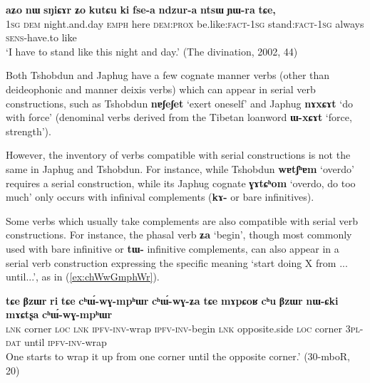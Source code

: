 \documentclass[oneside,a4paper,11pt]{article}
\newcommand{\ipa}[1]{\textbf{\phon#1}} %
\newcommand{\jpg}[2]{\ipa{#1} `#2'} %
\begin{document}
\begin{exe}
\ex \label{ex:ki.fsea}
\gll \ipa{aʑo} 	\ipa{nɯ} 	\ipa{sŋiɕɤr} 	\ipa{ʑo} 	\ipa{kutɕu} 	\ipa{ki} 	\ipa{fse-a} 	\ipa{ndzur-a} 	\ipa{ntsɯ} 	\ipa{ɲɯ-ra} 	\ipa{tɕe,} \\
\textsc{1sg} \textsc{dem} night.and.day \textsc{emph} here \textsc{dem:prox} be.like:\textsc{fact-1sg} stand:\textsc{fact-1sg} always \textsc{sens}-have.to like \\
\glt `I have to stand like this night and day.' (The divination, 2002, 44)
\end{exe}




Both Tshobdun and Japhug have a few cognate manner verbs (other than deideophonic and manner deixis verbs) which can appear in serial verb constructions, such as Tshobdun \jpg{nɐʃeʃet}{exert oneself} and Japhug  \jpg{nɤxɕɤt}{do with force}  (denominal verbs derived from the Tibetan loanword \jpg{ɯ-xɕɤt}{force, strength}).

However, the inventory of verbs compatible with serial constructions is not the same in Japhug and Tshobdun. For instance, while Tshobdun \jpg{wɐtʃʰɐm}{overdo} requires a serial construction, while its Japhug cognate \jpg{ɣɤtɕʰom}{overdo, do too much}  only occurs with infinival complements (\ipa{kɤ-} or bare infinitives).

Some verbs which usually take complements are also compatible with serial verb constructions. 
 For instance, the phasal verb \jpg{ʑa}{begin}, though most commonly used with bare infinitive or \ipa{tɯ-} infinitive complements, can also appear in a serial verb construction expressing the specific meaning `start doing X from ... until...', as in (\ref{ex:chWwGmphWr}).

   \begin{exe}
\ex \label{ex:chWwGmphWr}
 \gll  \ipa{tɕe} 	\ipa{βzɯr} 	\ipa{ri} 	\ipa{tɕe} 	\ipa{cʰɯ́-wɣ-mpʰɯr} 	\ipa{cʰɯ́-wɣ-ʑa} 	\ipa{tɕe} 	\ipa{mɤpɕoʁ} 	\ipa{cʰu} 	\ipa{βzɯr} 	\ipa{nɯ-ɕki} 	\ipa{mɤɕtʂa} 	\ipa{cʰɯ́-wɣ-mpʰɯr}  \\
 \textsc{lnk} corner \textsc{loc} \textsc{lnk} \textsc{ipfv-inv-}wrap \textsc{ipfv-inv-}begin \textsc{lnk}  opposite.side \textsc{loc} corner \textsc{3pl-dat} until \textsc{ipfv-inv-}wrap  \\
 \glt  One starts to wrap it up from one corner until the opposite corner.' (30-mboR, 20)
\end{exe}
 
\end{document}
